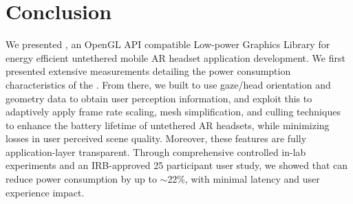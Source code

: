 \section{Conclusion}%
\label{sec:conclusion}



We presented {\myit}, an OpenGL API compatible Low-power Graphics Library
for energy efficient untethered mobile AR headset application development. We first presented extensive measurements detailing the power consumption characteristics of the {\mlo}. From there, we built {\myit} to use gaze/head orientation and geometry data to obtain user perception information, and exploit this to adaptively apply frame rate scaling,  mesh simplification, and culling techniques to enhance the battery lifetime of untethered AR headsets, while minimizing losses in user  perceived scene quality. Moreover, these features are fully application-layer  transparent. Through comprehensive controlled in-lab experiments and an IRB-approved 25 participant user study, we showed that {\myit} can reduce power consumption by up to $\sim$22\%, with minimal latency and user experience impact. 

%
%
%
%


%

%




